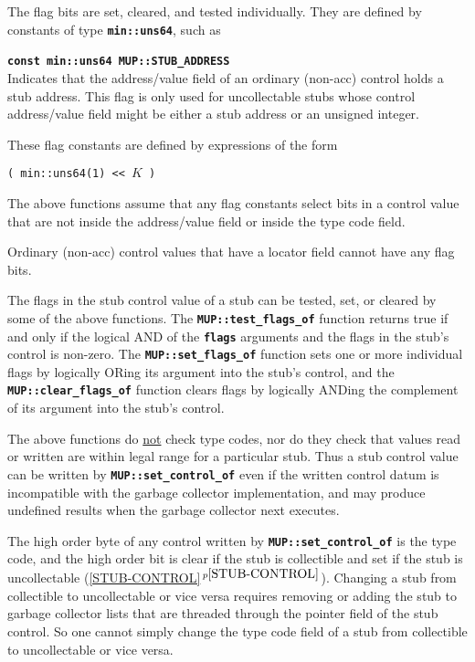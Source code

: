 \documentclass[12pt]{article}
\makeatletter
\newcommand{\TT}[1]{{\tt \bfseries #1}}
\newcommand{\ttindex}[1]{\index{#1@{\tt #1}}}
\newcommand{\itemref}[1]{\ref{#1}$\,^{p\pageref{#1}}$}
\newenvironment{indpar}[1][0.3in]%
	{\begin{list}{}%
		     {\setlength{\itemsep}{0in}%
		      \setlength{\topsep}{0in}%
		      \setlength{\parsep}{1ex}%
		      \setlength{\labelwidth}{#1}%
		      \setlength{\leftmargin}{#1}%
		      \addtolength{\leftmargin}{\labelsep}}%
	 \item}%
	{\end{list}}
\newcommand{\LABEL}[1]{\label{#1}}
\newcommand{\MUPKEY}[1]%
	   {\TT{#1}\ttindex{MUP::#1}\ttindex{#1}}
\makeatother
\begin{document}
The flag bits are set, cleared, and tested individually.  They are
defined by constants of type \TT{min::uns64}, such as

\begin{indpar}
\begin{list}{}{}
\item[\TT{const min::uns64 MUP::}\MUPKEY{STUB\_ADDRESS}]~%
	\LABEL{MIN::STUB_ADDRESS}\\
Indicates that the address/value field of an ordinary (non-acc)
control holds a stub address.  This flag is only used for
uncollectable stubs whose control address/value field might
be either a stub address or an unsigned integer.
\end{list}
\end{indpar}

These flag constants are defined by expressions of the form

\begin{center}
\verb|( min::uns64(1) << |$K$\verb| )|
\end{center}

The above functions assume that any flag constants select bits
in a control value that are not inside the address/value field
or inside the type code field.

Ordinary (non-acc) control values that have a locator
field cannot have any flag bits.

The flags in the stub control value of a stub can be tested, set, or
cleared by some of the above functions.
The \TT{MUP::test\_flags\_of} function
returns true if and only if the logical AND of the \TT{flags} arguments
and the flags in the stub's control is non-zero.  The \TT{MUP::set\_flags\_of}
function sets one or more individual flags by logically ORing its
argument into the stub's control, and the
\TT{MUP::clear\_flags\_of} function clears flags by logically ANDing
the complement of its argument into the stub's control.

The above functions do \underline{not} check type codes, nor do they check
that values read or written are within legal range for a particular
stub.  Thus a stub control value
can be written by \TT{MUP::set\_control\_of} even if the written
control datum is incompatible with the garbage collector implementation,
and may produce undefined results when the garbage collector
next executes.

The high order byte of any control written by \TT{MUP::set\_control\_of}
is the type code, and the high order bit is clear if the stub is collectible
and set if the stub is uncollectable (\itemref{STUB-CONTROL}).
Changing a stub from collectible to uncollectable or vice versa requires
removing or adding the stub to garbage collector lists that are threaded
through the pointer field of the stub control.  So one cannot simply
change the type code field of a stub from collectible to uncollectable
or vice versa.
\end{document}
